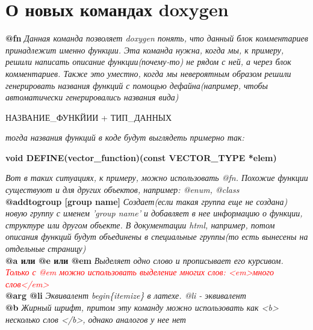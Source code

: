 \sloppy
\setlength{\parindent}{0em}

\section{О новых командах doxygen}
\textbf{@fn\sk}\newline
\textit{Данная команда позволяет doxygen понять, что данный блок комментариев принадлежит именно функции. Эта команда нужна, когда мы, к примеру, решили написать описание функции(почему-то) не рядом с ней, а через блок комментариев. Также это уместно, когда мы невероятным образом решили генерировать названия функций с помощью дефайна(например, чтобы автоматически генерировались названия вида)}

\begin{center}
НАЗВАНИЕ\_ФУНКЙИИ + ТИП\_ДАННЫХ
\end{center}

\textit{тогда названия функций в коде будут выглядеть примерно так:}

\begin{center}
\textbf{void DEFINE(vector\_function)(const VECTOR\_TYPE *elem)}
\end{center}

\textit{Вот в таких ситуациях, к примеру, можно использовать @fn. Похожие функции существуют и для других объектов, например: @enum, @class}\\[3mm]

\textbf{@addtogroup [group name]}\newline
\textit{Создает(если такая группа еще не создана) новую группу с именем 'group name' и добавляет в нее информацию о функции, структуре или другом объекте. В документации html, например, потом описания функций будут объединены в специальные группы(то есть вынесены на отдельные страницу)}\\[3mm]

\textbf{@a или @e или @em}\newline
\textit{Выделяет одно слово и прописывает его курсивом. \textcolor{red}{Только с @em можно использовать выделение многих слов: <em>много слов</em>} }\\[3mm]

\textbf{@arg @li}\newline
\textit{Эквивалент begin\{itemize\} в латехе. @li - эквивалент}\\[3mm]

\textbf{@b}\newline
\textit{Жирный шрифт, притом эту команду можно использовать как <b> несколько слов </b>, однако аналогов у нее нет}\\[3mm]

